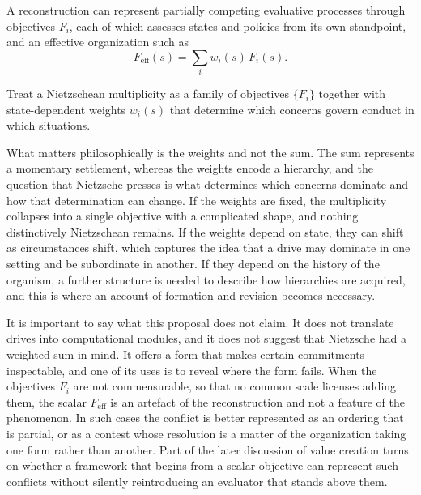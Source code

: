 A reconstruction can represent partially competing evaluative processes through objectives $F_i$, each of which assesses states and policies from its own standpoint, and an effective organization such as
\[
F_{\mathrm{eff}}(s) = \sum_i w_i(s)\,F_i(s).
\]

\begin{proposal}
Treat a Nietzschean multiplicity as a family of objectives $\{F_i\}$ together with state-dependent weights $w_i(s)$ that determine which concerns govern conduct in which situations.
\end{proposal}

What matters philosophically is the weights and not the sum. The sum represents a momentary settlement, whereas the weights encode a hierarchy, and the question that Nietzsche presses is what determines which concerns dominate and how that determination can change. If the weights are fixed, the multiplicity collapses into a single objective with a complicated shape, and nothing distinctively Nietzschean remains. If the weights depend on state, they can shift as circumstances shift, which captures the idea that a drive may dominate in one setting and be subordinate in another. If they depend on the history of the organism, a further structure is needed to describe how hierarchies are acquired, and this is where an account of formation and revision becomes necessary.

It is important to say what this proposal does not claim. It does not translate drives into computational modules, and it does not suggest that Nietzsche had a weighted sum in mind. It offers a form that makes certain commitments inspectable, and one of its uses is to reveal where the form fails. When the objectives $F_i$ are not commensurable, so that no common scale licenses adding them, the scalar $F_{\mathrm{eff}}$ is an artefact of the reconstruction and not a feature of the phenomenon. In such cases the conflict is better represented as an ordering that is partial, or as a contest whose resolution is a matter of the organization taking one form rather than another. Part of the later discussion of value creation turns on whether a framework that begins from a scalar objective can represent such conflicts without silently reintroducing an evaluator that stands above them.

